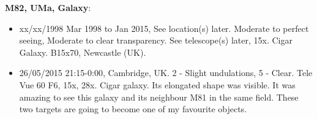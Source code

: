 {\bf M82, UMa, Galaxy}:
\begin{itemize}
\item xx/xx/1998 Mar 1998 to Jan 2015, See location(s) later. Moderate to perfect seeing, Moderate to clear transparency. See telescope(s) later, 15x. Cigar Galaxy. B15x70, Newcastle (UK).
\item 26/05/2015 21:15-0:00, Cambridge, UK. 2 - Slight undulations, 5 - Clear. Tele Vue 60 F6, 15x, 28x. Cigar galaxy. Its elongated shape was visible. It was amazing to see this galaxy and its neighbour M81 in the same field. These two targets are going to become one of my favourite objects.  
\end{itemize}

